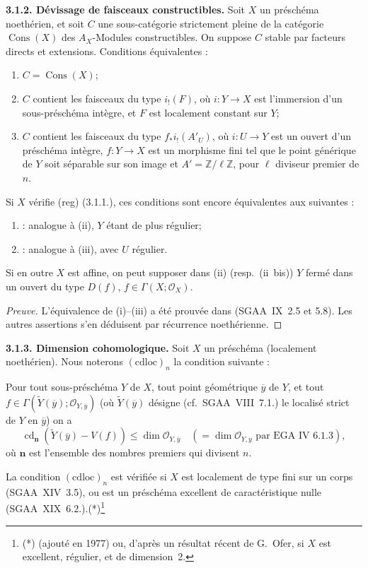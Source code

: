 \documentclass[11pt]{article}
\providecommand{\cO}{\mathcal{O}}
\providecommand{\wt}[1]{\widetilde{#1}}
\providecommand{\Cons}{\operatorname{Cons}}
\DeclareMathOperator{\cd}{cd}
\newcommand{\Z}{\mathbb{Z}}
\newcommand{\ol}[1]{\overline{#1}}
\providecommand{\Z}{\mathbb Z}
\begin{document}
\textbf{3.1.2. Dévissage de faisceaux constructibles.} Soit $X$ un préschéma noethérien, et soit $C$ une sous-catégorie strictement pleine de la catégorie $\Cons(X)$ des $A_X$-Modules constructibles. On suppose $C$ stable par facteurs directs et extensions. Conditions équivalentes :
\begin{enumerate}
\item[(i)] $C = \Cons(X)$;
\item[(ii)] $C$ contient les faisceaux du type $i_{!}(F)$, où $i : Y \to X$ est l'immersion d'un sous-préschéma intègre, et $F$ est localement constant sur $Y$;
\item[(iii)] $C$ contient les faisceaux du type $f_{*}i_{!}(A'_U)$, où $i : U \to Y$ est un ouvert d'un préschéma intègre, $f : Y \to X$ est un morphisme fini tel que le point générique de $Y$ soit séparable sur son image et $A' = \Z/\ell\Z$, pour $\ell$ diviseur premier de $n$.
\end{enumerate}
Si $X$ vérifie (reg) (3.1.1.), ces conditions sont encore équivalentes aux suivantes :
\begin{enumerate}
\item[(ii~bis)] : analogue à (ii), $Y$ étant de plus régulier;
\item[(iii~bis)] : analogue à (iii), avec $U$ régulier.
\end{enumerate}
Si en outre $X$ est affine, on peut supposer dans (ii) (resp.~(ii~bis)) $Y$ fermé dans un ouvert du type $D(f)$, $f \in \Gamma(X; \cO_X)$.

\begin{proof}[Preuve]
L'équivalence de (i)--(iii) a été prouvée dans (SGAA~IX~2.5 et 5.8). Les autres assertions s'en déduisent par récurrence noethérienne.
\end{proof}

\textbf{3.1.3. Dimension cohomologique.} Soit $X$ un préschéma (localement noethérien). Nous noterons $(\mathrm{cdloc})_n$ la condition suivante :

Pour tout sous-préschéma $Y$ de $X$, tout point géométrique $\ol{y}$ de $Y$, et tout $f \in \Gamma(\wt{Y}(\ol{y}); \cO_{Y,\ol{y}})$ (où $\wt{Y}(\ol{y})$ désigne (cf.~SGAA~VIII~7.1.) le localisé strict de $Y$ en $\ol{y}$) on a
\[
\cd_{\mathbf{n}}(\wt{Y}(\ol{y}) - V(f)) \leqslant \dim \cO_{Y,\ol{y}} \quad (= \dim \cO_{Y,y} \text{ par EGA~IV~6.1.3}),
\]
où $\mathbf{n}$ est l'ensemble des nombres premiers qui divisent $n$.

La condition $(\mathrm{cdloc})_n$ est vérifiée si $X$ est localement de type fini sur un corps (SGAA~XIV~3.5), ou est un préschéma excellent de caractéristique nulle (SGAA~XIX~6.2.).(*)\footnote{(*) (ajouté en 1977) ou, d'après un résultat récent de G.~Ofer, si $X$ est excellent, régulier, et de dimension~2.}
\end{document}
